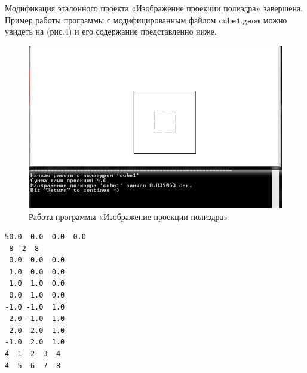Модификация эталонного проекта «Изображение проекции полиэдра» завершена. Пример работы программы 
с модифицированным файлом $\texttt{cube1.geom}$ можно увидеть на (рис.4) и его содержание представленно ниже.
\begin{figure}[ht!]
\begin{center}
\includegraphics[width=0.8\hsize]{images/cube1}
\end{center}
\caption{Работа программы «Изображение проекции полиэдра»}\label{fig:polyedr}
\end{figure}
\newpage\begin{small}
\begin{verbatim}
50.0  0.0  0.0  0.0
 8  2  8
 0.0  0.0  0.0	
 1.0  0.0  0.0
 1.0  1.0  0.0	
 0.0  1.0  0.0	
-1.0 -1.0  1.0	
 2.0 -1.0  1.0	
 2.0  2.0  1.0	
-1.0  2.0  1.0	
4  1  2  3  4      
4  5  6  7  8
\end{verbatim}
\end{small}



